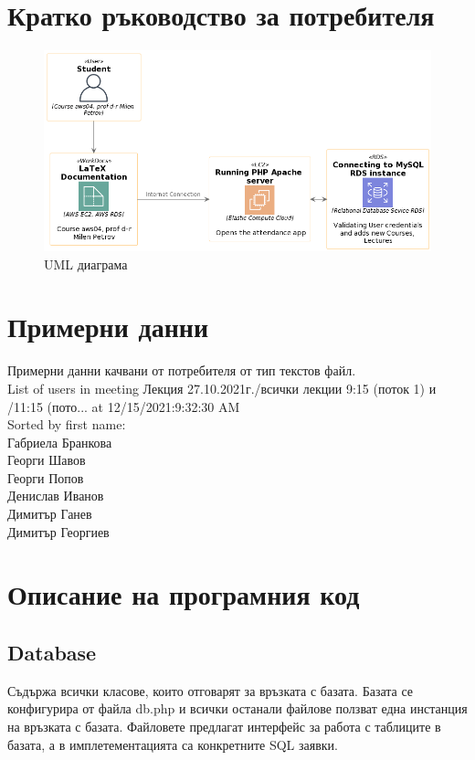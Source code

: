 \documentclass[12pt]{article}
\begin{document}
\section{Кратко ръководство за потребителя}
\begin{figure}[!htb]
    \centering
            \includegraphics[scale=0.5]{81908_diagram.png}
            \caption{UML диаграма}
\end{figure}    
\section{Примерни данни}
Примерни данни качвани от потребителя от тип текстов файл. \\
List of users in meeting Лекция 27.10.2021г./всички лекции 9:15 (поток 1) и /11:15 (пото... at 12/15/2021:9:32:30 AM \\
Sorted by first name: \\
Габриела Бранкова \\
Георги Шавов \\
Георги Попов \\
Денислав Иванов \\
Димитър Ганев \\ 
Димитър Георгиев \\

\section{Описание на програмния код}

\subsection{Database}
Съдържа всички класове, които отговарят за връзката с базата. Базата се конфигурира от файла db.php и всички останали файлове ползват една инстанция на връзката с базата. Файловете предлагат интерфейс за работа с таблиците в базата, а в имплетементацията са конкретните SQL заявки.
\end{document}
